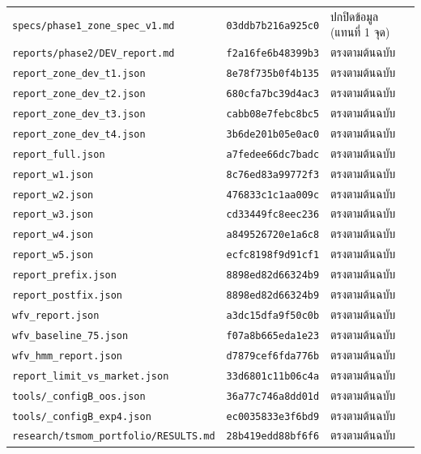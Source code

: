{\begin{longtable}{@{}>{\raggedright\arraybackslash}p{8.6cm}p{2.7cm}>{\raggedright\arraybackslash}p{3.4cm}@{}}
\texttt{specs/\allowbreak{}phase1\_zone\_spec\_v1.md} & \texttt{03ddb7b216a925c0} & ปกปิดข้อมูล (แทนที่ 1 จุด) \\
\texttt{reports/\allowbreak{}phase2/\allowbreak{}DEV\_report.md} & \texttt{f2a16fe6b48399b3} & ตรงตามต้นฉบับ \\
\texttt{report\_zone\_dev\_t1.json} & \texttt{8e78f735b0f4b135} & ตรงตามต้นฉบับ \\
\texttt{report\_zone\_dev\_t2.json} & \texttt{680cfa7bc39d4ac3} & ตรงตามต้นฉบับ \\
\texttt{report\_zone\_dev\_t3.json} & \texttt{cabb08e7febc8bc5} & ตรงตามต้นฉบับ \\
\texttt{report\_zone\_dev\_t4.json} & \texttt{3b6de201b05e0ac0} & ตรงตามต้นฉบับ \\
\texttt{report\_full.json} & \texttt{a7fedee66dc7badc} & ตรงตามต้นฉบับ \\
\texttt{report\_w1.json} & \texttt{8c76ed83a99772f3} & ตรงตามต้นฉบับ \\
\texttt{report\_w2.json} & \texttt{476833c1c1aa009c} & ตรงตามต้นฉบับ \\
\texttt{report\_w3.json} & \texttt{cd33449fc8eec236} & ตรงตามต้นฉบับ \\
\texttt{report\_w4.json} & \texttt{a849526720e1a6c8} & ตรงตามต้นฉบับ \\
\texttt{report\_w5.json} & \texttt{ecfc8198f9d91cf1} & ตรงตามต้นฉบับ \\
\texttt{report\_prefix.json} & \texttt{8898ed82d66324b9} & ตรงตามต้นฉบับ \\
\texttt{report\_postfix.json} & \texttt{8898ed82d66324b9} & ตรงตามต้นฉบับ \\
\texttt{wfv\_report.json} & \texttt{a3dc15dfa9f50c0b} & ตรงตามต้นฉบับ \\
\texttt{wfv\_baseline\_75.json} & \texttt{f07a8b665eda1e23} & ตรงตามต้นฉบับ \\
\texttt{wfv\_hmm\_report.json} & \texttt{d7879cef6fda776b} & ตรงตามต้นฉบับ \\
\texttt{report\_limit\_vs\_market.json} & \texttt{33d6801c11b06c4a} & ตรงตามต้นฉบับ \\
\texttt{tools/\allowbreak{}\_configB\_oos.json} & \texttt{36a77c746a8dd01d} & ตรงตามต้นฉบับ \\
\texttt{tools/\allowbreak{}\_configB\_exp4.json} & \texttt{ec0035833e3f6bd9} & ตรงตามต้นฉบับ \\
\texttt{research/\allowbreak{}tsmom\_portfolio/\allowbreak{}RESULTS.md} & \texttt{28b419edd88bf6f6} & ตรงตามต้นฉบับ \\

\end{longtable}}
